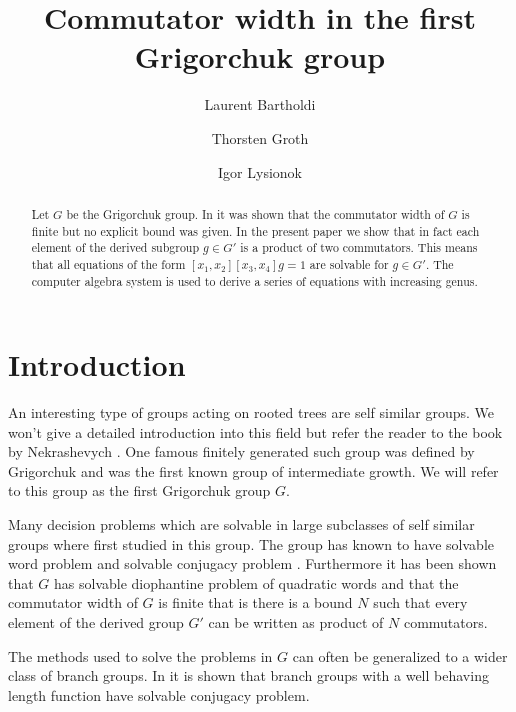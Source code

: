 \documentclass[a4paper,11pt]{amsart}
\begin{document}
\title{Commutator width in the first Grigorchuk group}
\author{Laurent Bartholdi}
\author{Thorsten Groth}
\author{Igor Lysionok}
\begin{abstract}
Let $G$ be the Grigorchuk group. In \cite{Lysenok:QudraticEquationsInGrig} it was shown that the commutator width of $G$ is finite but no explicit bound was given.
In the present paper we show that in fact each element of the derived subgroup $g\in G'$ is a product of two commutators. This means that all equations
of the form $[x_1,x_2][x_3,x_4]g=1$ are solvable for $g\in G'$. The computer algebra system \cite{GAP4} is used to derive a series of equations with increasing 
genus. 
\end{abstract}
\maketitle
\tableofcontents

\section{Introduction}
An interesting type of groups acting on rooted trees are self similar
groups. We won't give a detailed introduction into this field but
refer the reader to the book by Nekrashevych \cite{Nekrashevych:SelfSimilarGroups}. 
One famous finitely generated such group was defined by 
Grigorchuk and was the first known group of intermediate growth. We will
refer to this group as the first Grigorchuk group $G$.

Many decision problems which are solvable in large subclasses of 
self similar groups where first studied in this group. The group
has known to have solvable word problem and solvable conjugacy problem
\cite{Leonov:Conjugacy-alg.-Grig-group,Rozhkov:Conjugacy-alg.-Grig-group}.
Furthermore it has been shown that $G$ has solvable diophantine problem of
quadratic words and that the commutator width of $G$ is finite
\cite{Lysenok:QudraticEquationsInGrig} that is there is a bound $N$ such
that every element of the derived group $G'$ can be written as product
of $N$ commutators.

The methods used to solve the problems in $G$ can often be generalized 
to a wider class of branch groups. In
\cite{GrigorchukWilson:CP_for_certain_branch_groups} it is shown that
branch groups with a well behaving length function have solvable 
conjugacy problem.
\end{document}
